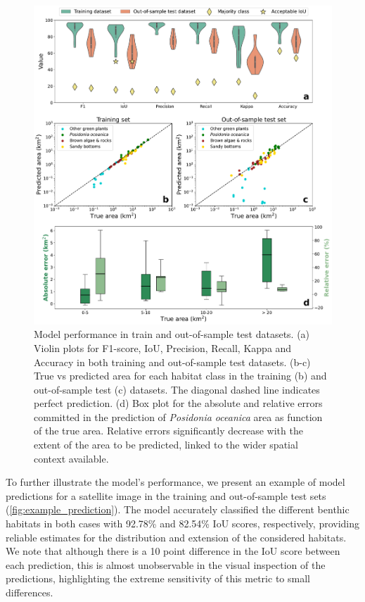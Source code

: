 \begin{figure}[H]
    \centering
    \includegraphics[width=\textwidth]{Figures/Model_performance.pdf}
    \caption[Model performance in train and out-of-sample test datasets]{Model
        performance in train and out-of-sample test datasets. (a)
        Violin plots for F1-score, IoU, Precision, Recall, Kappa and Accuracy
        in both
        training and out-of-sample test datasets. (b-c) True vs predicted area
        for each
        habitat class in the training (b) and out-of-sample test (c) datasets.
        The
        diagonal dashed line indicates perfect prediction. (d) Box plot for the
        absolute
        and relative errors committed in the prediction of \textit{Posidonia
            oceanica}
        area as function of the true area. Relative errors significantly
        decrease with
        the extent of the area to be predicted, linked to the wider spatial
        context
        available.}
    \label{fig:model_performance}
\end{figure}

To further illustrate the model's performance, we present an example of model
predictions for a satellite image in the training and out-of-sample test sets
(\cref{fig:example_prediction}). The model accurately classified the different
benthic habitats in both cases with 92.78\% and 82.54\% IoU scores,
respectively, providing reliable estimates for the distribution and extension
of the considered habitats. We note that although there is a 10 point
difference in the IoU score between each prediction, this is almost
unobservable in the visual inspection of the predictions, highlighting the
extreme sensitivity of this metric to small differences.

